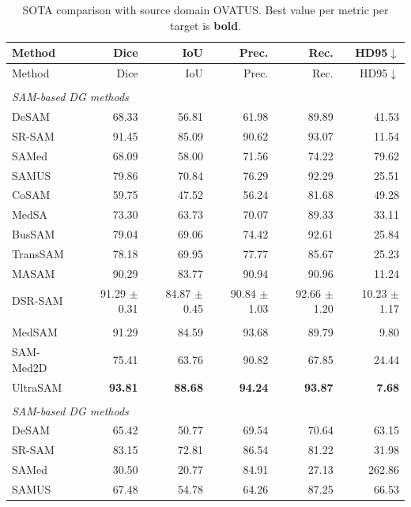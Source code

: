 \documentclass[10pt]{article}
\begin{document}
{\small
\begin{longtable}{lrrrrr}
\caption{SOTA comparison with source domain OVATUS. Best value per metric per target is \textbf{bold}.}
\label{tab:sota_ovatus}\\
\toprule
Method & Dice & IoU & Prec. & Rec. & HD95$\downarrow$ \\
\midrule
\endfirsthead
\toprule
Method & Dice & IoU & Prec. & Rec. & HD95$\downarrow$ \\
\midrule
\endhead
\endfoot
\bottomrule
\endlastfoot
\multicolumn{6}{l}{\textit{Target: OTU}} \\
\midrule
\multicolumn{6}{l}{\textit{SAM-based DG methods}} \\
DeSAM & 68.33 & 56.81 & 61.98 & 89.89 & 41.53 \\
SR-SAM & 91.45 & 85.09 & 90.62 & 93.07 & 11.54 \\
SAMed & 68.09 & 58.00 & 71.56 & 74.22 & 79.62 \\
SAMUS & 79.86 & 70.84 & 76.29 & 92.29 & 25.51 \\
CoSAM & 59.75 & 47.52 & 56.24 & 81.68 & 49.28 \\
MedSA & 73.30 & 63.73 & 70.07 & 89.33 & 33.11 \\
BusSAM & 79.04 & 69.06 & 74.42 & 92.61 & 25.84 \\
TransSAM & 78.18 & 69.95 & 77.77 & 85.67 & 25.23 \\
MASAM & 90.29 & 83.77 & 90.94 & 90.96 & 11.24 \\
DSR-SAM & 91.29 $\pm$ 0.31 & 84.87 $\pm$ 0.45 & 90.84 $\pm$ 1.03 & 92.66 $\pm$ 1.20 & 10.23 $\pm$ 1.17 \\
\addlinespace[2pt]
\multicolumn{6}{l}{\textit{Zero-shot foundation models}} \\
MedSAM & 91.29 & 84.59 & 93.68 & 89.79 & 9.80 \\
SAM-Med2D & 75.41 & 63.76 & 90.82 & 67.85 & 24.44 \\
UltraSAM & \textbf{93.81} & \textbf{88.68} & \textbf{94.24} & \textbf{93.87} & \textbf{7.68} \\
\addlinespace[4pt]
\multicolumn{6}{l}{\textit{Target: USOVA}} \\
\midrule
\multicolumn{6}{l}{\textit{SAM-based DG methods}} \\
DeSAM & 65.42 & 50.77 & 69.54 & 70.64 & 63.15 \\
SR-SAM & 83.15 & 72.81 & 86.54 & 81.22 & 31.98 \\
SAMed & 30.50 & 20.77 & 84.91 & 27.13 & 262.86 \\
SAMUS & 67.48 & 54.78 & 64.26 & 87.25 & 66.53 \\

\end{longtable}}
\end{document}
